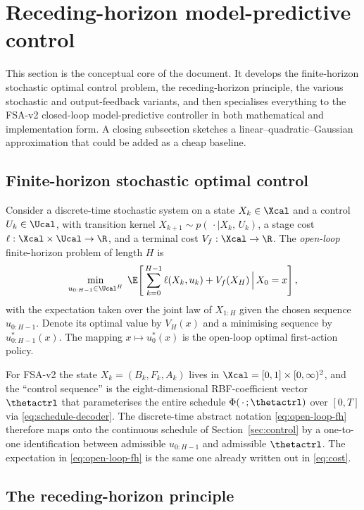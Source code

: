\section{Receding-horizon model-predictive control}\label{sec:mpc}

This section is the conceptual core of the document. It develops the
finite-horizon stochastic optimal control problem, the receding-horizon
principle, the various stochastic and output-feedback variants, and then
specialises everything to the FSA-v2 closed-loop model-predictive
controller in both mathematical and implementation form. A closing
subsection sketches a linear--quadratic--Gaussian approximation that
could be added as a cheap baseline.

\subsection{Finite-horizon stochastic optimal control}\label{sec:mpc-finite}

Consider a discrete-time stochastic system on a state $X_k \in \Xcal$ and
a control $U_k \in \Ucal$, with transition kernel
$X_{k+1} \sim p(\,\cdot\mid X_k,\,U_k)$, a stage cost
$\ell:\Xcal \times \Ucal \to \R$, and a terminal cost
$V_f:\Xcal \to \R$. The \emph{open-loop} finite-horizon problem of length
$H$ is
\begin{equation}
  \min_{u_{0:H-1}\in\Ucal^H}
    \;\E\!\left[\,\sum_{k=0}^{H-1} \ell(X_k,u_k)
                  + V_f(X_H)\,\Big|\,X_0 = x\right],
  \label{eq:open-loop-fh}
\end{equation}
with the expectation taken over the joint law of $X_{1:H}$ given the
chosen sequence $u_{0:H-1}$. Denote its optimal value by $V_H(x)$ and a
minimising sequence by $u_{0:H-1}^*(x)$. The mapping
$x \mapsto u_0^*(x)$ is the open-loop optimal first-action policy.

For FSA-v2 the state $X_k = (B_k,F_k,A_k)$ lives in
$\Xcal = [0,1]\times[0,\infty)^2$, and the ``control sequence''
is the eight-dimensional RBF-coefficient vector $\thetactrl$ that
parameterises the entire schedule $\Phi(\,\cdot\,;\thetactrl)$ over
$[0,T]$ via \eqref{eq:schedule-decoder}. The discrete-time abstract
notation \eqref{eq:open-loop-fh} therefore maps onto the continuous
schedule of Section~\ref{sec:control} by a one-to-one identification
between admissible $u_{0:H-1}$ and admissible $\thetactrl$. The
expectation in \eqref{eq:open-loop-fh} is the same one already written
out in \eqref{eq:cost}.

\subsection{The receding-horizon principle}\label{sec:mpc-receding}

